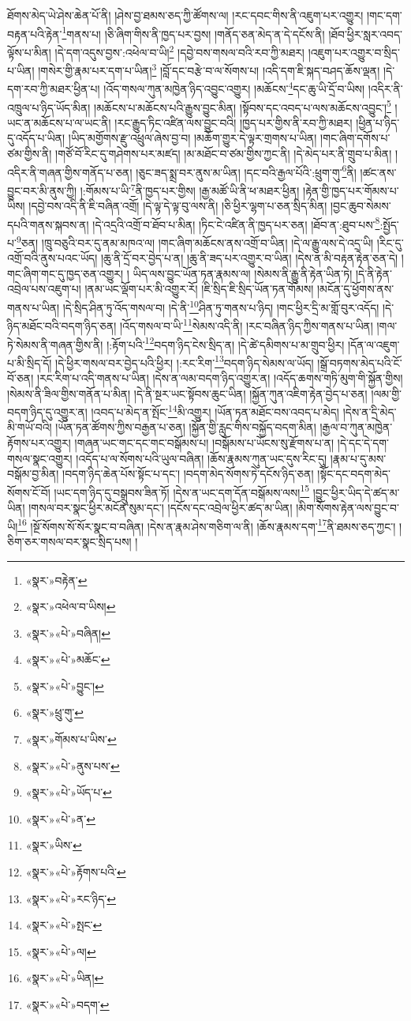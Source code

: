 ཐོགས་མེད་ཡེ་ཤེས་ཆེན་པོ་ནི། །ཤེས་བྱ་ཐམས་ཅད་ཀྱི་ཚོགས་ལ། །རང་དབང་གིས་ནི་འཇུག་པར་འགྱུར། །གང་དག་བརྟན་པའི་རྟེན་\footnote{«སྣར་»བརྟེན་}གནས་པ། །ཅི་ཞིག་གིས་ནི་ཁྱད་པར་བྱས། །གནོད་ཅན་མེད་ན་དེ་དངོས་ནི། །ཐོབ་ཕྱིར་སླར་འབད་ལྟོས་པ་མིན། །དེ་དག་འདུས་བྱས་:འཕེལ་བ་ཡི།\footnote{«སྣར་»འཕེལ་བ་ཡིས།} །དབྱེ་བས་གསལ་བའི་རབ་ཀྱི་མཐར། །འཇུག་པར་འགྱུར་བ་སྲིད་པ་ཡིན། །གསེར་གྱི་རྣམ་པར་དག་པ་ཡིན།\footnote{«སྣར་»«པེ་»བཞིན།} །བློ་དང་བརྩེ་བ་ལ་སོགས་པ། །འདི་དག་ཇི་སྐད་བཤད་ཆོས་ལྡན། །དེ་དག་རབ་ཀྱི་མཐར་ཕྱིན་པ། །འོད་གསལ་ཀུན་མཁྱེན་ཉིད་འབྱུང་འགྱུར། །མཆོངས་\footnote{«སྣར་»«པེ་»མཆོང་}དང་ཆུ་ཡི་དྲོ་བ་ཡིས། །འདིར་ནི་འཁྲུལ་པ་ཉིད་ཡོད་མིན། །མཆོངས་པ་མཆོངས་པའི་རྒྱུས་བྱུང་མིན། །སྟོབས་དང་འབད་པ་ལས་མཆོངས་འབྱུང་།\footnote{«སྣར་»«པེ་»བྱུང་།} །ཡང་ན་མཆོངས་པ་ལ་ཡང་ནི། །རང་རྒྱུད་ཏིང་འཛིན་ལས་བྱུང་བའི། །ཁྱད་པར་གྱིས་ནི་རབ་ཀྱི་མཐར། །ཕྱིན་པ་ཉིད་དུ་འདོད་པ་ཡིན། །ཡིད་མགྱོགས་རྫུ་འཕྲུལ་ཞེས་བྱ་བ། །མཆོག་གྱུར་དེ་ལྟར་གྲགས་པ་ཡིན། །གང་ཞིག་དགོས་པ་ཙམ་གྱིས་ནི། །གཙོ་བོ་རིང་དུ་གཤེགས་པར་མཛད། །མ་མཐོང་བ་ཙམ་གྱིས་ཀྱང་ནི། །དེ་མེད་པར་ནི་གྲུབ་པ་མིན། །འདིར་ནི་གཞན་གྱིས་གནོད་པ་ཅན། །ཅུང་ཟད་སྨྲ་བར་ནུས་མ་ཡིན། །དང་བའི་རྒྱལ་པོའི་:ཕྲུག་གུ་\footnote{«སྣར་»ཕྲུ་གུ་}ནི། །ཚང་ནས་བྱུང་བར་མི་ནུས་ཀྱི། །:གོམས་པ་ཡི་\footnote{«སྣར་»གོམས་པ་ཡིས་}ནི་ཁྱད་པར་གྱིས། །རྒྱ་མཚོ་ཡི་ནི་ཕ་མཐར་ཕྱིན། །རྟེན་གྱི་ཁྱད་པར་གོམས་པ་ཡིས། །དབྱེ་བས་འདི་ནི་ཇི་བཞིན་འགྲོ། །དེ་ལྟ་དེ་ལྟ་བུ་ལས་ནི། །ཅི་ཕྱིར་ལྷག་པ་ཅན་སྲིད་མིན། །བྱང་ཆུབ་སེམས་དཔའི་གནས་སྐབས་ན། །དེ་འདྲའི་འགྲོ་བ་ཐོབ་པ་མིན། །ཏིང་ངེ་འཛིན་ནི་ཁྱད་པར་ཅན། །ཐོབ་ན་:ཐུབ་པས་\footnote{«སྣར་»«པེ་»ནུས་པས་}:སྤྱོད་པ་\footnote{«སྣར་»«པེ་»ཡོད་པ་}ཅན། །ཁྲུ་བཅུའི་བར་དུ་ནམ་མཁའ་ལ། །གང་ཞིག་མཆོངས་ནས་འགྲོ་བ་ཡིན། །དེ་ལ་རྒྱུ་ལས་དེ་འདྲ་ཡི། །རིང་དུ་འགྲོ་བའི་ནུས་པའང་ཡོད། །ཆུ་ནི་དྲོ་བར་བྱེད་པ་ན། །ཆུ་ནི་ཟད་པར་འགྱུར་བ་ཡིན། །དེས་ན་མི་བརྟན་རྟེན་ཅན་དེ། །གང་ཞིག་གང་དུ་ཁྱད་ཅན་འགྱུར། །
ཡིད་ལས་བྱུང་ཡོན་ཏན་རྣམས་ལ། །སེམས་ནི་རྒྱུ་ནི་རྟེན་ཡིན་ཏེ། །དེ་ནི་རྟེན་འབྲེལ་པས་འཇུག་པ། །ནམ་ཡང་ལྡོག་པར་མི་འགྱུར་རོ། །ཇི་སྲིད་ཇི་སྲིད་ཡོན་ཏན་གོམས། །མངོན་དུ་ཕྱོགས་ནས་གནས་པ་ཡིན། །དེ་སྲིད་ཤིན་ཏུ་འོད་གསལ་བ། །དེ་ནི་\footnote{«སྣར་»«པེ་»ན་}ཤིན་ཏུ་གནས་པ་ཉིད། །གང་ཕྱིར་དྲི་མ་གློ་བུར་འདོད། །དེ་ཉིད་མཐོང་བའི་བདག་ཉིད་ཅན། །འོད་གསལ་བ་ཡི་\footnote{«སྣར་»ཡིས་}སེམས་འདི་ནི། །རང་བཞིན་ཉིད་ཀྱིས་གནས་པ་ཡིན། །གལ་ཏེ་སེམས་ནི་གཞན་གྱིས་ནི། །:རྟོག་པའི་\footnote{«སྣར་»«པེ་»རྟོགས་པའི་}བདག་ཉིད་ངེས་སྲིད་ན། །དེ་ཚེ་དམིགས་པ་མ་གྲུབ་ཕྱིར། །དོན་ལ་འཇུག་པ་མི་སྲིད་དོ། །དེ་ཕྱིར་གསལ་བར་བྱེད་པའི་ཕྱིར། །:རང་རིག་\footnote{«སྣར་»«པེ་»རང་ཉིད་}བདག་ཉིད་སེམས་ལ་ཡོད། །སྒྲོ་བཏགས་མེད་པའི་ངོ་བོ་ཅན། །རང་རིག་པ་འདི་གནས་པ་ཡིན། །དེས་ན་ལམ་བདག་ཉིད་འགྱུར་ན། །འདོད་ཆགས་གཏི་མུག་གི་སྐྱོན་གྱིས། །སེམས་ནི་ཟིལ་གྱིས་གནོན་པ་མིན། །དེ་ནི་སྔར་ཡང་སྟོབས་ཆུང་ཡིན། །སྐྱོན་ཀུན་འཇིག་རྟེན་བྱེད་པ་ཅན། །ལམ་གྱི་བདག་ཉིད་དུ་འགྱུར་ན། །འབད་པ་མེད་ན་སྤོང་\footnote{«སྣར་»«པེ་»སྤང་}མི་འགྱུར། །ཡོན་ཏན་མཐོང་བས་འབད་པ་མེད། །དེས་ན་དྲི་མེད་མི་གཡོ་བའི། །ཡོན་ཏན་ཚོགས་ཀྱིས་བརྒྱན་པ་ཅན། །སྐྱོན་གྱི་རླུང་གིས་བསྐྱོད་བདག་མིན། །རྒྱལ་བ་ཀུན་མཁྱེན་རྟོགས་པར་འགྱུར། །གཞན་ཡང་གང་དང་གང་བསྒོམས་པ། །བསྒོམས་པ་ཡོངས་སུ་རྫོགས་པ་ན། །དེ་དང་དེ་དག་གསལ་སྣང་འགྱུར། །འདོད་པ་ལ་སོགས་པའི་ཡུལ་བཞིན། །ཆོས་རྣམས་ཀུན་ཡང་དུས་རིང་དུ། །རྣམ་པ་དུ་མས་བསྒོམ་བྱ་མིན། །བདག་ཉིད་ཆེན་པོས་སྟོང་པ་དང་། །བདག་མེད་སོགས་ཏེ་དངོས་ཉིད་ཅན། །སྟོང་དང་བདག་མེད་སོགས་ངོ་བོ། །ཡང་དག་ཉིད་དུ་བསྒྲུབས་ཟིན་ཏོ། །དེས་ན་ཡང་དག་དོན་བསྒོམས་ལས།\footnote{«སྣར་»«པེ་»ལ།} །བྱུང་ཕྱིར་ཡིད་དེ་ཚད་མ་ཡིན། །གསལ་བར་སྣང་ཕྱིར་མངོན་སུམ་དང་། །དངོས་དང་འབྲེལ་ཕྱིར་ཚད་མ་ཡིན། །མིག་སོགས་རྟེན་ལས་བྱུང་བ་ཡི།\footnote{«སྣར་»«པེ་»ཡིན།} །སྔོ་སོགས་སོ་སོར་སྣང་བ་བཞིན། །དེས་ན་རྣམ་ཤེས་གཅིག་ལ་ནི། །ཆོས་རྣམས་དག་\footnote{«སྣར་»«པེ་»བདག་}ནི་ཐམས་ཅད་ཀྱང་། །ཅིག་ཅར་གསལ་བར་སྣང་སྲིད་པས། །
